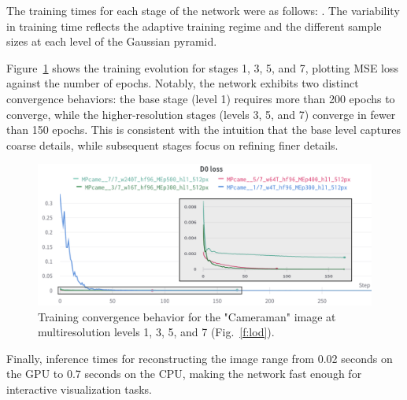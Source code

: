 The training times for each stage of the network were as follows: . The variability in training time reflects the adaptive training regime and the different sample sizes at each level of the Gaussian pyramid.


Figure~\ref{f:training-epochs} shows the training evolution for stages 1, 3, 5, and 7, plotting MSE loss against the number of epochs. Notably, the network exhibits two distinct convergence behaviors: the base stage (level 1) requires more than 200 epochs to converge, while the higher-resolution stages (levels 3, 5, and 7) converge in fewer than 150 epochs. This is consistent with the intuition that the base level captures coarse details, while subsequent stages focus on refining finer details. 

\begin{figure}[!h]
\centering
\includegraphics[width=\linewidth]{img/ch5/stages-training-epochs.png}
\caption{Training convergence behavior for the "Cameraman" image at multiresolution levels 1, 3, 5, and 7 (Fig.~\ref{f:lod}).}
\label{f:training-epochs}
\end{figure}


Finally, inference times for reconstructing the image range from 0.02 seconds on the GPU to 0.7 seconds on the CPU, making the network fast enough for interactive visualization tasks.

